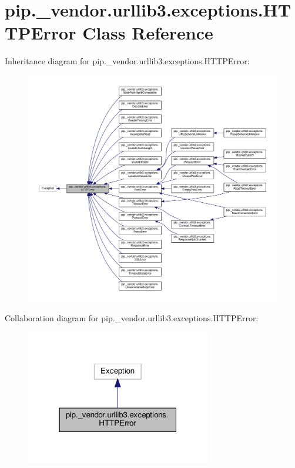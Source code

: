 \hypertarget{classpip_1_1__vendor_1_1urllib3_1_1exceptions_1_1HTTPError}{}\section{pip.\+\_\+vendor.\+urllib3.\+exceptions.\+H\+T\+T\+P\+Error Class Reference}
\label{classpip_1_1__vendor_1_1urllib3_1_1exceptions_1_1HTTPError}


Inheritance diagram for pip.\+\_\+vendor.\+urllib3.\+exceptions.\+H\+T\+T\+P\+Error\+:
\nopagebreak
\begin{figure}[H]
\begin{center}
\leavevmode
\includegraphics[width=350pt]{classpip_1_1__vendor_1_1urllib3_1_1exceptions_1_1HTTPError__inherit__graph}
\end{center}
\end{figure}


Collaboration diagram for pip.\+\_\+vendor.\+urllib3.\+exceptions.\+H\+T\+T\+P\+Error\+:
\nopagebreak
\begin{figure}[H]
\begin{center}
\leavevmode
\includegraphics[width=229pt]{classpip_1_1__vendor_1_1urllib3_1_1exceptions_1_1HTTPError__coll__graph}
\end{center}
\end{figure}


